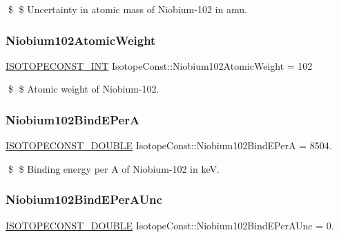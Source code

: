 \$ \$ Uncertainty in atomic mass of Niobium-\/102 in amu. \mbox{\label{group___isotope_const-_niobium-_nb102_gaa75b873e0743177c118c541f7c59befc}} 
\subsubsection{\texorpdfstring{Niobium102\+Atomic\+Weight}{Niobium102AtomicWeight}}
{\footnotesize\ttfamily \mbox{\hyperlink{group___isotope_const-_macros_ga5f18360b3e99483a35c32d789e62621c}{I\+S\+O\+T\+O\+P\+E\+C\+O\+N\+S\+T\+\_\+\+I\+NT}} Isotope\+Const\+::\+Niobium102\+Atomic\+Weight = 102}

\$ \$ Atomic weight of Niobium-\/102. \mbox{\label{group___isotope_const-_niobium-_nb102_gafde78383018110bd7d3abddd091684e4}} 
\subsubsection{\texorpdfstring{Niobium102\+Bind\+E\+PerA}{Niobium102BindEPerA}}
{\footnotesize\ttfamily \mbox{\hyperlink{group___isotope_const-_macros_ga8f45a7272ce02c0b4c65c44636ed719a}{I\+S\+O\+T\+O\+P\+E\+C\+O\+N\+S\+T\+\_\+\+D\+O\+U\+B\+LE}} Isotope\+Const\+::\+Niobium102\+Bind\+E\+PerA = 8504.}

\$ \$ Binding energy per A of Niobium-\/102 in keV. \mbox{\label{group___isotope_const-_niobium-_nb102_gafd07c9b1aaa913690f4fdfe5eb79a694}} 
\subsubsection{\texorpdfstring{Niobium102\+Bind\+E\+Per\+A\+Unc}{Niobium102BindEPerAUnc}}
{\footnotesize\ttfamily \mbox{\hyperlink{group___isotope_const-_macros_ga8f45a7272ce02c0b4c65c44636ed719a}{I\+S\+O\+T\+O\+P\+E\+C\+O\+N\+S\+T\+\_\+\+D\+O\+U\+B\+LE}} Isotope\+Const\+::\+Niobium102\+Bind\+E\+Per\+A\+Unc = 0.}

